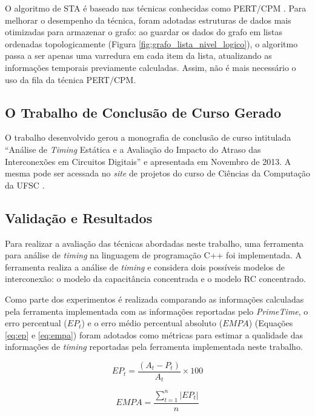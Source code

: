 \documentclass[
	12pt,				%
	openright,			%
	twoside,			%
	a4paper,			%
	english,			%
	french,				%
	spanish,			%
	brazil,				%
	]{abntex2}
\begin{document}
O algoritmo de STA é baseado nas técnicas conhecidas como PERT/CPM \cite{BhaskerChadha09}. Para melhorar o desempenho da técnica, foram adotadas estruturas de dados mais otimizadas para armazenar o grafo: ao guardar os dados do grafo em listas ordenadas topologicamente (Figura \ref{fig:grafo_lista_nivel_logico}), o algoritmo passa a ser apenas uma varredura em cada item da lista, atualizando as informações temporais previamente calculadas. Assim, não é mais necessário o uso da fila da técnica PERT/CPM.

\subsection{O Trabalho de Conclusão de Curso Gerado}
\label{sec:tcc}
O trabalho desenvolvido gerou a monografia de conclusão de curso intitulada ``Análise de \textit{Timing} Estática e a Avaliação do Impacto do Atraso das Interconexões em Circuitos Digitais'' e apresentada em Novembro de 2013. A mesma pode ser acessada no \textit{site} de projetos do curso de Ciências da Computação da UFSC \cite{linkTCC}.


\subsection{Validação e Resultados}

Para realizar a avaliação das técnicas abordadas neste trabalho, uma ferramenta para análise de \textit{timing} na linguagem de programação C++ foi implementada. A ferramenta realiza a análise de \textit{timing} e considera dois possíveis modelos de interconexão: o modelo da capacitância concentrada e o modelo RC concentrado.

Como parte dos experimentos é realizada comparando as informações calculadas pela ferramenta implementada com as informações reportadas pelo \textit{PrimeTime}, o erro percentual ($EP_t$) e o erro médio percentual absoluto ($EMPA$) (Equações \ref{eq:ep} e \ref{eq:empa}) foram adotados como métricas para estimar a qualidade das informações de \textit{timing} reportadas pela ferramenta implementada neste trabalho.

\begin{equation}
\label{eq:ep}
EP_t = \frac{(A_t - P_t)}{A_t} \times 100
\end{equation}

\begin{equation}
\label{eq:empa}
EMPA = \frac{\sum_{t=1}^n |EP_t|}{n}
\end{equation}
\end{document}
